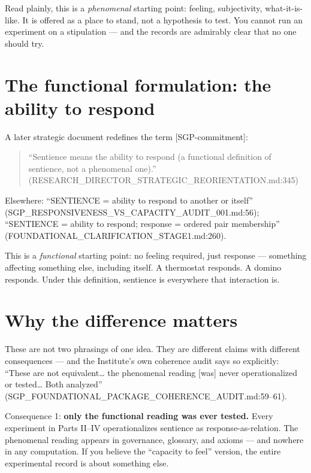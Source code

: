 \documentclass[
  11pt,
]{book}
\begin{document}
Read plainly, this is a \emph{phenomenal} starting point: feeling,
subjectivity, what-it-is-like. It is offered as a place to stand, not a
hypothesis to test. You cannot run an experiment on a stipulation ---
and the records are admirably clear that no one should try.

\section{The functional formulation: the ability to
respond}\label{the-functional-formulation-the-ability-to-respond}

A later strategic document redefines the term {[}SGP-commitment{]}:

\begin{quote}
``Sentience means the ability to respond (a functional definition of
sentience, not a phenomenal one).''
(RESEARCH\_DIRECTOR\_STRATEGIC\_REORIENTATION.md:345)
\end{quote}

Elsewhere: ``SENTIENCE = ability to respond to another or itself''
(SGP\_RESPONSIVENESS\_VS\_CAPACITY\_AUDIT\_001.md:56); ``SENTIENCE =
ability to respond; response = ordered pair membership''
(FOUNDATIONAL\_CLARIFICATION\_STAGE1.md:260).

This is a \emph{functional} starting point: no feeling required, just
response --- something affecting something else, including itself. A
thermostat responds. A domino responds. Under this definition, sentience
is everywhere that interaction is.

\section{Why the difference matters}\label{why-the-difference-matters}

These are not two phrasings of one idea. They are different claims with
different consequences --- and the Institute's own coherence audit says
so explicitly: ``These are not equivalent\ldots{} the phenomenal reading
{[}was{]} never operationalized or tested\ldots{} Both analyzed''
(SGP\_FOUNDATIONAL\_PACKAGE\_COHERENCE\_AUDIT.md:59--61).

Consequence 1: \textbf{only the functional reading was ever tested.}
Every experiment in Parts II--IV operationalizes sentience as
response-as-relation. The phenomenal reading appears in governance,
glossary, and axioms --- and nowhere in any computation. If you believe
the ``capacity to feel'' version, the entire experimental record is
about something else.
\end{document}
